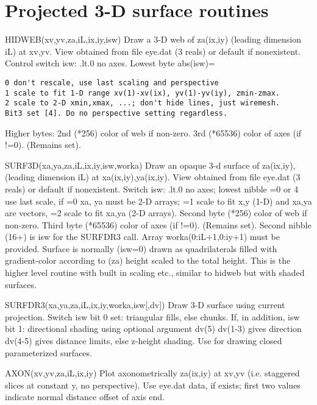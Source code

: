 \documentclass[12pt]{article}
\newif \iftth
\begin{document}
\section{Projected 3-D surface routines}

\iftth \special{html:<a href="hidtest.f"><img align="right" src="hidtest.png"></a>}\fi

HIDWEB(xv,yv,za,iL,ix,iy,isw) Draw a 3-D web of za(ix,iy) (leading
dimension iL) at xv,yv.  View obtained from file eye.dat (3 reals) or
default if nonexistent. Control switch isw: .lt.0 no axes.
Lowest byte abs(isw)=
\begin{verbatim}
0 don't rescale, use last scaling and perspective
1 scale to fit 1-D range xv(1)-xv(ix), yv(1)-yv(iy), zmin-zmax.
2 scale to 2-D xmin,xmax, ...; don't hide lines, just wiremesh.
Bit3 set [4]. Do no perspective setting regardless.
\end{verbatim}

Higher bytes: {2nd} (*256) color of web if non-zero. {3rd} (*65536) color
of axes (if !=0). (Remains set).

SURF3D(xa,ya,za,iL,ix,iy,isw,worka) Draw an opaque 3-d surface of
za(ix,iy), (leading dimension iL) at xa(ix,iy),ya(ix,iy).  View
obtained from file eye.dat (3 reals) or default if nonexistent. Switch
isw: .lt.0 no axes; lowest nibble =0 or 4 use last scale, if =0 xa, ya
must be 2-D arrays; =1 scale to fit x,y (1-D) and xa,ya are vectors,
=2 scale to fit xa,ya (2-D arrays). Second byte (*256) color of web if
non-zero. Third byte (*65536) color of axes (if !=0). (Remains
set). Second nibble (16+) is isw for the SURFDR3 call. Array
worka(0:iL+1,0:iy+1) must be provided.  Surface is normally (isw=0)
drawn as quadrilaterals filled with gradient-color according to (za)
height scaled to the total height. This is the higher level routine
with built in scaling etc., similar to hidweb but with shaded surfaces.

SURFDR3(xa,ya,za,iL,ix,iy,worka,isw[,dv]) Draw 3-D surface using current
projection. Switch isw bit 0 set: triangular fills, else chunks.  If,
in addition, isw bit 1: directional shading using optional argument
dv(5) dv(1-3) gives direction dv(4-5) gives distance limits, else
z-height shading. Use for drawing closed parameterized surfaces.

AXON(xv,yv,za,iL,ix,iy) Plot axonometrically za(ix,iy) at xv,yv (i.e.
staggered slices at constant y, no perspective).  Use eye.dat data, if
exists; first two values indicate normal distance offset of axis end.
\end{document}

